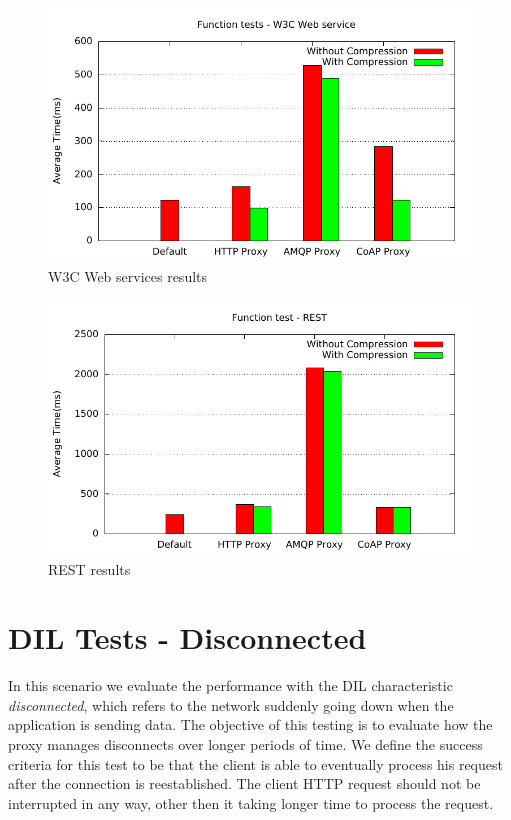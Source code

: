 \begin{figure}[H]
\center
\includegraphics[scale=0.75]{../results/function_tests/nffi/out.pdf}
\caption{W3C Web services results}
\end{figure}

\begin{figure}[H]
\center
\includegraphics[scale=0.75]{../results/function_tests/rest/out.pdf}
\caption{REST results}
\end{figure}


\section{DIL Tests - Disconnected}

In this scenario we evaluate  the performance with the DIL characteristic
\textit{disconnected}, which refers to the network suddenly going down when the
application is sending data. The objective of this testing is to evaluate how
the proxy manages disconnects over longer periods of time. We define the success
criteria for this test to be that the client is able to eventually process his
request after the connection is reestablished. The client HTTP request should
not be interrupted in any way, other then it taking longer time to process the
request.

